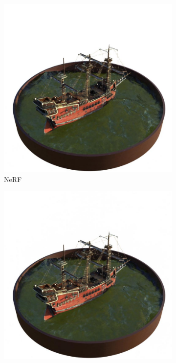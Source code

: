 \documentclass[12pt, a4paper, twoside]{book}
\numberwithin{equation}{chapter}
\numberwithin{theorem}{section}
\numberwithin{definition}{section}
\numberwithin{definitionChapter}{chapter}
\begin{document}
	\begin{figure}[H]
		\centering
		\begin{subfigure}{0.3\textwidth}
			\centering
			\includegraphics[scale=0.2]{img/nerf/nerf_ship_38.jpg}
			\caption{NeRF}
		\end{subfigure}
		\hspace*{\fill}
		\begin{subfigure}{0.3\textwidth}
			\centering
			\includegraphics[scale=0.2]{img/mipnerf/mipnerf_ship_38.jpg}

\end{subfigure}
\end{figure}
\end{document}
